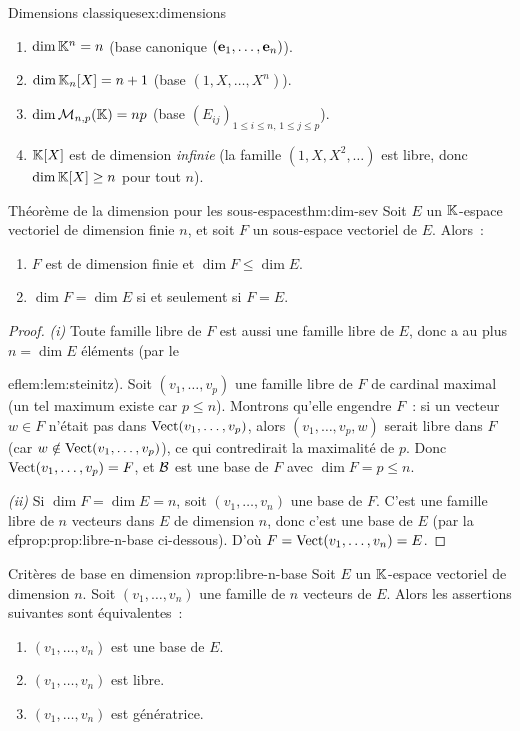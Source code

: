 \begin{example}{Dimensions classiques}{ex:dimensions}
  \begin{enumerate}[label=(\alph*)]
    \item $\dim{\mathbb{K}}^n = n$ (base canonique $(\mathbf{e}_{1},\ldots,\mathbf{e}_{n})$).
    \item $\dim{\mathbb{K}}_n[X] = n+1$ (base $(1,X,\ldots,X^n)$).
    \item $\dim\mathcal{M}_{n,p}({\mathbb{K}}) = np$ (base $(E_{ij})_{1\leq i\leq n,\,1\leq j\leq p}$).
    \item ${\mathbb{K}}[X]$ est de dimension \emph{infinie} (la famille
      $(1,X,X^2,\ldots)$ est libre, donc $\dim{\mathbb{K}}[X]\geq n$ pour tout
      $n$).
  \end{enumerate}
\end{example}

\begin{theorem}{Théorème de la dimension pour les sous-espaces}{thm:dim-sev}
  Soit $E$ un ${\mathbb{K}}$-espace vectoriel de dimension finie $n$, et soit $F$
  un sous-espace vectoriel de $E$. Alors~:
  \begin{enumerate}[label=(\roman*)]
    \item $F$ est de dimension finie et $\dim F\leq\dim E$.
    \item $\dim F = \dim E$ si et seulement si $F=E$.
  \end{enumerate}
\end{theorem}

\begin{proof}
  \emph{(i)} Toute famille libre de $F$ est aussi une famille libre de
  $E$, donc a au plus $n=\dim E$ éléments (par le
  
ef{lem:lem:steinitz}). Soit $(v_1,\ldots,v_p)$ une famille libre de
  $F$ de cardinal maximal (un tel maximum existe car $p\leq n$).
  Montrons qu'elle engendre $F$~: si un vecteur $w\in F$ n'était pas
  dans $\operatorname{Vect}(v_1,\ldots,v_p)$, alors $(v_1,\ldots,v_p,w)$ serait
  libre dans $F$ (car $w\notin\operatorname{Vect}(v_1,\ldots,v_p)$), ce qui
  contredirait la maximalité de $p$. Donc
  $\operatorname{Vect}(v_1,\ldots,v_p)=F$, et ${\mathcal{B}}$ est une base de $F$ avec
  $\dim F=p\leq n$.

  \emph{(ii)} Si $\dim F=\dim E=n$, soit $(v_1,\ldots,v_n)$ une base
  de $F$. C'est une famille libre de $n$ vecteurs dans $E$ de dimension
  $n$, donc c'est une base de $E$ (par la 
ef{prop:prop:libre-n-base}
  ci-dessous). D'où $F=\operatorname{Vect}(v_1,\ldots,v_n)=E$.
\end{proof}

\begin{proposition}{Critères de base en dimension $n$}{prop:libre-n-base}
  Soit $E$ un ${\mathbb{K}}$-espace vectoriel de dimension $n$. Soit
  $(v_1,\ldots,v_n)$ une famille de $n$ vecteurs de $E$. Alors les
  assertions suivantes sont équivalentes~:
  \begin{enumerate}[label=(\roman*)]
    \item $(v_1,\ldots,v_n)$ est une base de $E$.
    \item $(v_1,\ldots,v_n)$ est libre.
    \item $(v_1,\ldots,v_n)$ est génératrice.
  \end{enumerate}
\end{proposition}

